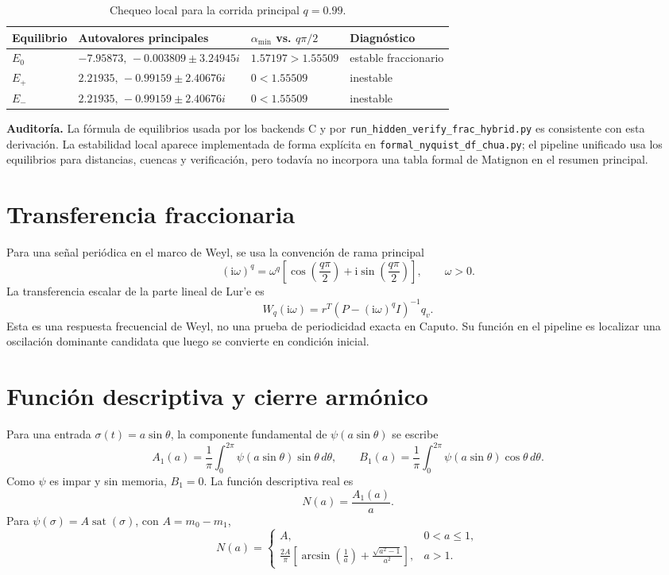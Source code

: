 \documentclass[11pt]{article}
\newcommand{\ii}{\mathrm{i}}
\begin{document}
\begin{table}[h]
\centering
\small
\begin{tabular}{@{}llll@{}}
\toprule
Equilibrio & Autovalores principales & \(\alpha_{\min}\) vs. \(q\pi/2\) & Diagnóstico \\
\midrule
\(E_0\) &
\(-7.95873,\,-0.003809\pm3.24945i\) &
\(1.57197>1.55509\) &
estable fraccionario \\
\(E_+\) &
\(2.21935,\,-0.99159\pm2.40676i\) &
\(0<1.55509\) &
inestable \\
\(E_-\) &
\(2.21935,\,-0.99159\pm2.40676i\) &
\(0<1.55509\) &
inestable \\
\bottomrule
\end{tabular}
\caption{Chequeo local para la corrida principal \(q=0.99\).}
\end{table}

\textbf{Auditoría.} La fórmula de equilibrios usada por los backends C y por
\texttt{run\_hidden\_verify\_frac\_hybrid.py} es consistente con esta
derivación. La estabilidad local aparece implementada de forma explícita en
\texttt{formal\_nyquist\_df\_chua.py}; el pipeline unificado usa los
equilibrios para distancias, cuencas y verificación, pero todavía no incorpora
una tabla formal de Matignon en el resumen principal.

\section{Transferencia fraccionaria}

Para una señal periódica en el marco de Weyl, se usa la convención de rama
principal
\[
(\ii\omega)^q=\omega^q\left[\cos\left(\frac{q\pi}{2}\right)
+\ii\sin\left(\frac{q\pi}{2}\right)\right],
\qquad \omega>0.
\]
La transferencia escalar de la parte lineal de Lur'e es
\[
W_q(\ii\omega)=
r^T\left(P-(\ii\omega)^qI\right)^{-1}q_v.
\]
Esta es una respuesta frecuencial de Weyl, no una prueba de periodicidad
exacta en Caputo. Su función en el pipeline es localizar una oscilación
dominante candidata que luego se convierte en condición inicial.

\section{Función descriptiva y cierre armónico}

Para una entrada \(\sigma(t)=a\sin\theta\), la componente fundamental de
\(\psi(a\sin\theta)\) se escribe
\[
A_1(a)=\frac{1}{\pi}\int_0^{2\pi}\psi(a\sin\theta)\sin\theta\,d\theta,
\qquad
B_1(a)=\frac{1}{\pi}\int_0^{2\pi}\psi(a\sin\theta)\cos\theta\,d\theta.
\]
Como \(\psi\) es impar y sin memoria, \(B_1=0\). La función descriptiva real
es
\[
N(a)=\frac{A_1(a)}{a}.
\]
Para \(\psi(\sigma)=A\operatorname{sat}(\sigma)\), con \(A=m_0-m_1\),
\[
N(a)=
\begin{cases}
A, & 0<a\leq 1,\\[4pt]
\displaystyle
\frac{2A}{\pi}\left[
\arcsin\left(\frac{1}{a}\right)
+\frac{\sqrt{a^2-1}}{a^2}
\right], & a>1.
\end{cases}
\]
\end{document}
